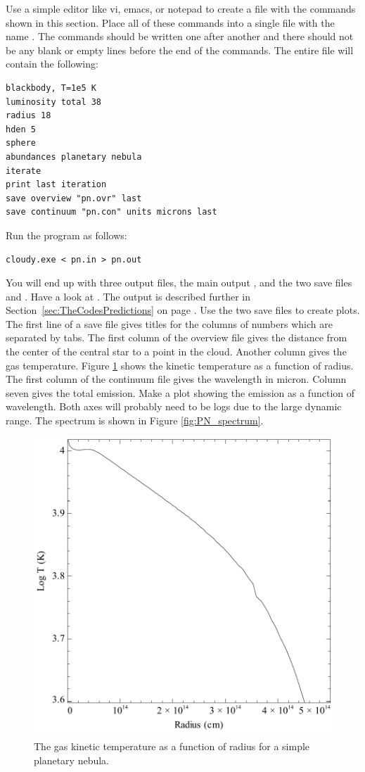 \documentclass[12pt,twoside]{article}
\begin{document}
{Use a simple editor like vi, emacs, or notepad to create a file with
the commands shown in this section.
Place all of these commands
into a single file with the name .
The commands should be written
one after another and there should not be any blank or empty lines before
the end of the commands.
The entire file will contain the following:
\small
\begin{verbatim}
blackbody, T=1e5 K
luminosity total 38
radius 18
hden 5
sphere
abundances planetary nebula
iterate
print last iteration
save overview "pn.ovr" last
save continuum "pn.con" units microns last
\end{verbatim}
\normalsize
Run the program as follows:
\small
\begin{verbatim}
cloudy.exe < pn.in > pn.out
\end{verbatim}
\normalsize
You will end up with three output files,
the main output , and the
two save files  and .
Have a look at .  The output is
described further in Section~\ref{sec:TheCodesPredictions}
on page \pageref{sec:TheCodesPredictions}.
Use the two save
files to create plots.  The first line of
a save file gives titles for
the columns of numbers which are separated by tabs.
The first column of the overview file gives the distance
from the center of the central star to a point in the cloud.
Another column gives the gas temperature.
Figure \ref{fig:PN_temperature} shows the kinetic temperature as a function of radius.
The first column of the continuum file gives the wavelength in micron.
Column seven gives the total emission.  Make a plot showing the emission
as a function of wavelength.  Both axes will probably need to be logs due
to the large dynamic range.
The spectrum is shown in Figure \ref{fig:PN_spectrum}.

\begin{figure}
\begin{center}
\includegraphics[clip=on,width=0.8\columnwidth,height=0.8\textheight,keepaspectratio]{PN_temperature}
\end{center}
\caption{The gas kinetic temperature as a function of radius for a simple planetary nebula.}
\label{fig:PN_temperature}
\end{figure}

}
\end{document}
